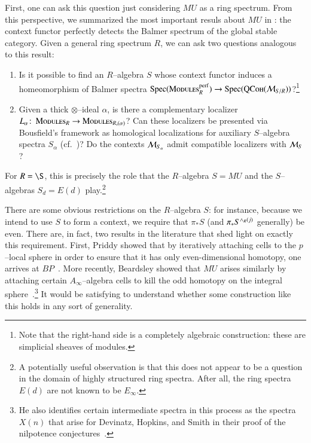 First, one can ask this question just considering $MU$ as a ring spectrum.  From this perspective, we summarized the most important resuls about $MU$ in : the context functor perfectly detects the Balmer spectrum of the global stable category.  Given a general ring spectrum $R$, we can ask two questions analogous to this result:
\begin{enumerate}
\item Is it possible to find an $R$--algebra $S$ whose context functor induces a homeomorphism of Balmer spectra $\operatorname{Spec}(\normalfont\textsc{Modules}_R^{\mathrm{perf}}) \to \operatorname{Spec}(\normalfont\textsc{QCoh}(\mathcal{M}_{S/R}))$?\footnote{Note that the right-hand side is a completely algebraic construction: these are simplicial sheaves of modules.}
\item Given a thick $\otimes$--ideal $\alpha$, is there a complementary localizer $L_\alpha\colon\thinspace \normalfont\textsc{Modules}_R \to \normalfont\textsc{Modules}_{R,(\alpha)}$?  Can these localizers be presented via Bousfield's framework as homological localizations for auxiliary $S$--algebra spectra $S_\alpha$ (cf.\ )?  Do the contexts $\mathcal{M}_{S_\alpha}$ admit compatible localizers with $\mathcal{M}_{S}$?
\end{enumerate}
For $R = \S$, this is precisely the role that the $R$--algebra $S = MU$ and the $S$--algebras $S_d = E(d)$ play.\footnote{A potentially useful observation is that this does not appear to be a question in the domain of highly structured ring spectra.  After all, the ring spectra $E(d)$ are not known to be $E_\infty$.}

There are some obvious restrictions on the $R$--algebra $S$: for instance, because we intend to use $S$ to form a context, we require that $\pi_* S$ (and $\pi_* S^{\wedge_R (j)}$ generally) be even.  There are, in fact, two results in the literature that shed light on exactly this requirement.  First, Priddy showed that by iteratively attaching cells to the $p$--local sphere in order to ensure that it has only even-dimensional homotopy, one arrives at $BP$~\cite{Priddy}.  More recently, Beardsley showed that $MU$ arises similarly by attaching certain $A_\infty$--algebra cells to kill the odd homotopy on the integral sphere~\cite{Beardsley}.\footnote{He also identifies certain intermediate spectra in this process as the spectra $X(n)$ that arise for Devinatz, Hopkins, and Smith in their proof of the nilpotence conjectures~\cite{DHS}.}  It would be satisfying to understand whether some construction like this holds in any sort of generality.

